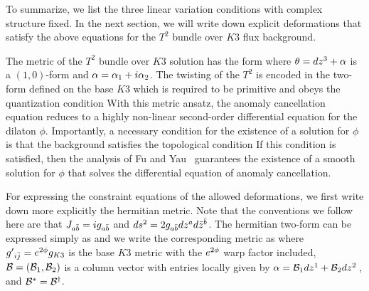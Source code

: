 To summarize, we list the three linear variation conditions with
complex structure fixed. \eqn{} \eqn{}
\eqn{} In the next section, we will write down explicit deformations
that satisfy the above equations for the $T^2$ bundle over $K3$
flux background.



The metric of the $T^2$ bundle over $K3$ solution  has the form \eqn{} where $\theta=dz^3 + \alpha$
is a $(1,0)$-form and $\alpha = \alpha_1 + i \alpha_2$. The twisting of the
$T^2$ is encoded in the two-form defined on the base $K3$
\eqn{}
which is required to be primitive \eqn{}
and obeys the quantization condition \eqn{}  With this metric ansatz, the
anomaly cancellation equation reduces to a highly non-linear
second-order differential equation for the dilaton $\phi$.
Importantly, a necessary condition for the existence of a solution
for $\phi$ is that the background satisfies the topological
condition \eqn{} If this
condition is satisfied, then the analysis of Fu and Yau \FY\
guarantees the existence of a smooth solution for $\phi$ that
solves the differential equation of anomaly cancellation.


For expressing the constraint equations of the allowed
deformations, we first write down more explicitly the hermitian
metric.  Note that the conventions we follow here are that
$J_{a{\bar b}}=ig_{a{\bar b}}$ and $ds^2 = 2 g_{a{\bar b}}dz^a d{\bar z}^{\bar b}$.  The
hermitian two-form can be expressed simply as \eqn{} and we write
the corresponding metric as \eqn{}
where ${g'}_{i{\bar j}}=e^{2\phi}g_{K3}$ is the base $K3$ metric with the
$e^{2\phi}$ warp factor included, ${\cal B}=({\cal B}_1,{\cal B}_2)$ is a column
vector with entries locally given by $\alpha={\cal B}_1 dz^1 + {\cal B}_2 dz^2\,$,
and ${\cal B}^*={\cal B}^\dagger$.


